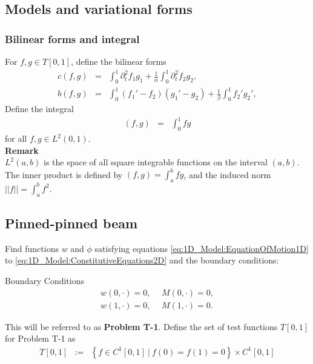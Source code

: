 		\subsection{Models and variational forms}
			\subsubsection*{Bilinear forms and integral}
				For $f,g \in T[0,1]$, define the bilinear forms
				\begin{eqnarray}
					c(f,g) & = & \int_0^1  \partial_t^2 f_1 g_1 + \frac{1}{\alpha}\int_0^1  \partial_t^2 f_2g_2, \label{eq:1D_Model:Bilinear} \\
					b(f,g) & = &   \int_0^1 (f_1'-f_2)(g_1' - g_2) + \frac{1}{\beta}\int_0^1 f_2' g_2', \label{eq:1D_Model:Bilinear_c}
				\end{eqnarray}
				Define the integral
				\begin{eqnarray}
				(f,g)
					&=& \int_{0}^1 fg \label{eq:1D_Model:Bilinear_int}
				\end{eqnarray} for all $f,g \in L^2(0,1).$\\

				\textbf{Remark}\\
				$L^2(a,b)$ is the space of all square integrable functions on the interval $(a,b)$. The inner product is defined by $\displaystyle (f,g) = \int_a^b fg$, and the induced norm $\displaystyle ||f|| = \int_a^b f^2$.\\

			\subsection*{Pinned-pinned beam}
				Find functions $w$ and $\phi$ satisfying equations \eqref{eq:1D_Model:EquationOfMotion1D} to \eqref{eq:1D_Model:ConstitutiveEquations2D} and the boundary conditions:

				{Boundary Conditions}\\
				\begin{eqnarray*}
					w(0,\cdot) = 0, \ \ &M(0,\cdot) = 0, \label{eq:1D_Model:ProblemT1BC1}\\
					w(1,\cdot) = 0, \ \ &M(1,\cdot) = 0. \label{eq:1D_Model:ProblemT1BC2}
				\end{eqnarray*}

				This will be referred to as \textbf{Problem T-1}. Define the set of test functions $T[0,1]$ for Problem T-1 as
				\begin{eqnarray*}
					T[0,1] &:=&  \left\{f \in C^1[0,1] \ | \ f(0) = f(1) = 0 \right\} \times C^1[0,1]
				\end{eqnarray*}


